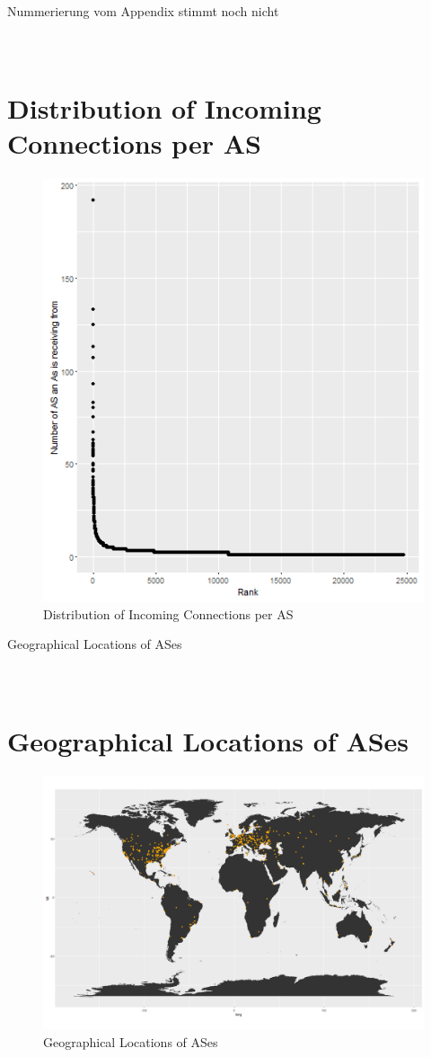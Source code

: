 \documentclass[conference]{IEEEtran}
\begin{document}
\pagebreak

\appendix

Nummerierung vom Appendix stimmt noch nicht

\section{\\Distribution of Incoming Connections per AS}


\begin{figure}[htbp]
\centerline{\includegraphics[scale=0.4]{Graphics/AsToDistribution.png}}
\caption{Distribution of Incoming Connections per AS}
\label{fig}
\end{figure}


Geographical Locations of ASes
\section{\\Geographical Locations of ASes}
\begin{figure}[htbp]
\centerline{\includegraphics[scale=0.2]{Graphics/ASesNurPunkte.png}}
\caption{Geographical Locations of ASes}
\label{fig}
\end{figure}
\end{document}
